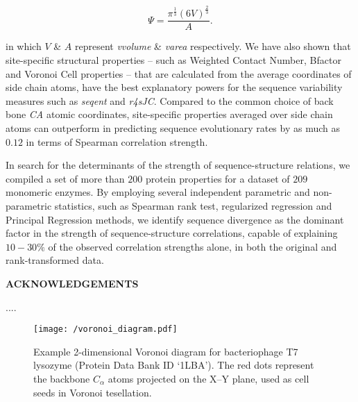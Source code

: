 \documentclass[11pt]{article}
\def\Acknowledgements{\bigskip  \bigskip \begin{center} \begin{large}
             \bf ACKNOWLEDGEMENTS \end{large}\end{center}}
\begin{document}
        \begin{equation}
        \label{eqn:sphericity}
        \Psi = \frac{\pi^{\frac{1}{3}}(6V)^{\frac{2}{3}}}{A}.
        \end{equation}

        in which $V$ \& $A$ represent {\it vvolume} \& {\it varea} respectively. We have also shown that site-specific structural properties -- such as Weighted Contact Number, Bfactor and Voronoi Cell properties -- that are calculated from the average coordinates of side chain atoms, have the best explanatory powers for the sequence variability measures such as {\it seqent} and {\it r4sJC}. Compared to the common choice of back bone {\it CA} atomic coordinates, site-specific properties averaged over side chain atoms can outperform in predicting sequence evolutionary rates by as much as $0.12$ in terms of Spearman correlation strength.

        In search for the determinants of the strength of sequence-structure relations, we compiled a set of more than $200$ protein properties for a dataset of $209$ monomeric enzymes. By employing several independent parametric and non-parametric statistics, such as Spearman rank test, regularized regression and Principal Regression methods, we identify sequence divergence as the dominant factor in the strength of sequence-structure correlations, capable of explaining $10-30\%$ of the observed correlation strengths alone, in both the original and rank-transformed data.


\Acknowledgements

....





    \begin{figure}[tbh]
        \begin{center}
        \texttt{[image: /voronoi\_diagram.pdf]}
        \end{center}
        \caption{Example 2-dimensional Voronoi diagram for bacteriophage T7 lysozyme (Protein Data Bank ID `1LBA'). The red dots represent the backbone $C_\alpha$ atoms projected on the X--Y plane, used as cell seeds in Voronoi tesellation.}
        \label{fig:voronoi}
    \end{figure}
\end{document}
